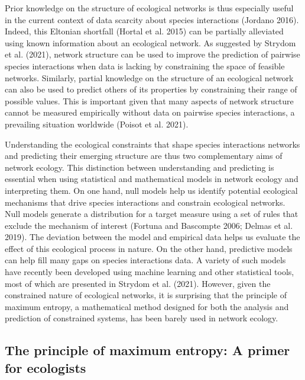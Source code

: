 \documentclass[11pt]{article}
\begin{document}
Prior knowledge on the structure of ecological networks is thus
especially useful in the current context of data scarcity about species
interactions (Jordano 2016). Indeed, this Eltonian shortfall (Hortal et
al. 2015) can be partially alleviated using known information about an
ecological network. As suggested by Strydom et al. (2021), network
structure can be used to improve the prediction of pairwise species
interactions when data is lacking by constraining the space of feasible
networks. Similarly, partial knowledge on the structure of an ecological
network can also be used to predict others of its properties by
constraining their range of possible values. This is important given
that many aspects of network structure cannot be measured empirically
without data on pairwise species interactions, a prevailing situation
worldwide (Poisot et al. 2021).

Understanding the ecological constraints that shape species interactions
networks and predicting their emerging structure are thus two
complementary aims of network ecology. This distinction between
understanding and predicting is essential when using statistical and
mathematical models in network ecology and interpreting them. On one
hand, null models help us identify potential ecological mechanisms that
drive species interactions and constrain ecological networks. Null
models generate a distribution for a target measure using a set of rules
that exclude the mechanism of interest (Fortuna and Bascompte 2006;
Delmas et al. 2019). The deviation between the model and empirical data
helps us evaluate the effect of this ecological process in nature. On
the other hand, predictive models can help fill many gaps on species
interactions data. A variety of such models have recently been developed
using machine learning and other statistical tools, most of which are
presented in Strydom et al. (2021). However, given the constrained
nature of ecological networks, it is surprising that the principle of
maximum entropy, a mathematical method designed for both the analysis
and prediction of constrained systems, has been barely used in network
ecology.

\hypertarget{the-principle-of-maximum-entropy-a-primer-for-ecologists}{%
\subsection{The principle of maximum entropy: A primer for
ecologists}\label{the-principle-of-maximum-entropy-a-primer-for-ecologists}}
\end{document}
